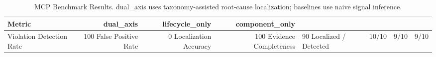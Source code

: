 \begin{table}[h]
\centering
\begin{tabular}{lrrr}
\hline
Metric & dual\_axis & lifecycle\_only & component\_only \\
\hline
Violation Detection Rate & 100%
False Positive Rate & 0%
Localization Accuracy & 100%
Evidence Completeness & 90%
Localized / Detected & 10/10 & 9/10 & 9/10 \\
\hline
\end{tabular}
\caption{MCP Benchmark Results. dual\_axis uses taxonomy-assisted root-cause localization; baselines use naive signal inference.}
\label{tab:benchmark}
\end{table}
